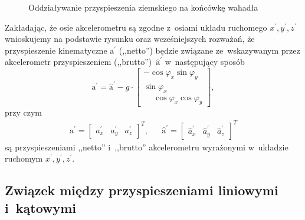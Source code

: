 \documentclass[paper=a4,DIV=12]{lpas}
\newcommand{\brm}[1]{\bm{\mathrm{#1}}}
\begin{document}
\begin{appendices}
\begin{figure}[htbp]
  \caption{Oddziaływanie przyspieszenia ziemskiego na końcówkę wahadła}
  \label{fig:AFKVE}
\end{figure}

Zakładając, że osie akcelerometru są zgodne z~osiami układu ruchomego
$x^{\prime},y^{\prime},z^{\prime}$ wnioskujemy na podstawie rysunku oraz
wcześniejszych rozważań, że przyspieszenie kinematyczne $\brm{a}^{\prime}$
(,,netto'') będzie związane ze~wskazywanym przez akcelerometr przyspieszeniem
(,,brutto'')~$\hat{\brm{a}}^{\prime}$ w~następujący sposób
\begin{equation}
  {\brm{a}^{\prime}} = \hat{\brm{a}}^{\prime}
  -
  g \cdot
  \begin{bmatrix}
              -\cos{\varphi_x} \sin{\varphi_y}  \\
                      \sin{\varphi_x}          \\
    \phantom{-}\cos{\varphi_x} \cos{\varphi_y}
  \end{bmatrix},
  \label{eq:EUIQU}
\end{equation}
przy czym
\begin{align}
  & \brm{a}^{\prime} = \begin{bmatrix}
    a_x^{\prime}  & a_y^{\prime}  & a_z^{\prime}
  \end{bmatrix}^T, &
  & \hat{\brm{a}}^{\prime}  = \begin{bmatrix}
    \hat{a}_x^{\prime}  & \hat{a}_y^{\prime}  & \hat{a}_z^{\prime}
  \end{bmatrix}^T &
  \label{eq:NL9I0}
\end{align}
są przyspieszeniami ,,netto'' i~,,brutto'' akcelerometru wyrażonymi w~układzie
ruchomym $x^{\prime},y^{\prime},z^{\prime}$.

\subsection{Związek między przyspieszeniami liniowymi i~kątowymi}
\label{sec:QTVP6}


\end{appendices}
\end{document}
